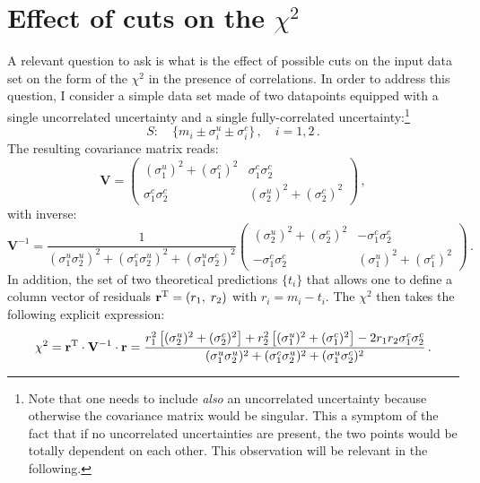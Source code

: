 \documentclass[10pt,a4paper]{article}
\begin{document}
\section{Effect of cuts on the $\chi^2$}

A relevant question to ask is what is the effect of possible cuts on
the input data set on the form of the $\chi^2$ in the presence of
correlations. In order to address this question, I consider a simple
data set made of two datapoints equipped with a single uncorrelated
uncertainty and a single fully-correlated uncertainty:\footnote{Note
  that one needs to include \textit{also} an uncorrelated uncertainty
  because otherwise the covariance matrix would be singular. This a
  symptom of the fact that if no uncorrelated uncertainties are
  present, the two points would be totally dependent on each
  other. This observation will be relevant in the following.}
\begin{equation}\label{eq:fullset}
S:\quad\{m_i\pm \sigma_i^u\pm \sigma_i^c\}\,,\quad i  =1,2\,.
\end{equation}
The resulting covariance matrix reads:
\begin{equation}
\mathbf{V}=\begin{pmatrix}
(\sigma_1^u)^2+ (\sigma_1^c)^2 & \sigma_1^c \sigma_2^c \\
\sigma_1^c \sigma_2^c & (\sigma_2^u)^2+ (\sigma_2^c)^2
\end{pmatrix}\,,
\end{equation}
with inverse:
\begin{equation}
\mathbf{V}^{-1}=\frac{1}{(\sigma_1^u \sigma_2^u)^2+ (\sigma_1^c \sigma_2^u)^2+ (\sigma_1^u \sigma_2^c)^2}\begin{pmatrix}
(\sigma_2^u)^2+ (\sigma_2^c)^2 & -\sigma_1^c \sigma_2^c \\
-\sigma_1^c \sigma_2^c & (\sigma_1^u)^2+ (\sigma_1^c)^2
\end{pmatrix}\,.
\end{equation}
In addition, the set of two theoretical predictions $\{t_i\}$ that
allows one to define a column vector of residuals
$\mathbf{r}^{\rm T}=(r_1,\;r_2)$ with $r_i=m_i-t_i$. The $\chi^2$ then
takes the following explicit expression:
\begin{equation}\label{eq:fullchi2}
  \chi^2= \mathbf{r}^{\rm T}\cdot \mathbf{V}^{-1}\cdot \mathbf{r}=
  \frac{r_1^2\left[(\sigma_2^u)^2+ (\sigma_2^c)^2\right]+r_2^2\left[(\sigma_1^u)^2+ (\sigma_1^c)^2\right]-2 r_1 r_2\sigma_1^c \sigma_2^c}{(\sigma_1^u \sigma_2^u)^2+ (\sigma_1^c \sigma_2^u)^2+ (\sigma_1^u \sigma_2^c)^2}\,.
\end{equation}
\end{document}
